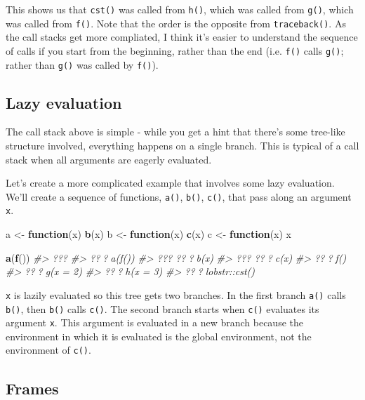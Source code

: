 \documentclass[]{book}
\newenvironment{Shaded}{\begin{snugshade}}{\end{snugshade}}
\newcommand{\CommentTok}[1]{\textcolor[rgb]{0.56,0.35,0.01}{\textit{#1}}}
\newcommand{\ControlFlowTok}[1]{\textcolor[rgb]{0.13,0.29,0.53}{\textbf{#1}}}
\newcommand{\KeywordTok}[1]{\textcolor[rgb]{0.13,0.29,0.53}{\textbf{#1}}}
\newcommand{\NormalTok}[1]{#1}
\newcommand{\StringTok}[1]{\textcolor[rgb]{0.31,0.60,0.02}{#1}}
\theoremstyle{definition}
\theoremstyle{definition}
\theoremstyle{definition}
\theoremstyle{remark}
\begin{document}
This shows us that \texttt{cst()} was called from \texttt{h()}, which
was called from \texttt{g()}, which was called from \texttt{f()}. Note
that the order is the opposite from \texttt{traceback()}. As the call
stacks get more compliated, I think it's easier to understand the
sequence of calls if you start from the beginning, rather than the end
(i.e. \texttt{f()} calls \texttt{g()}; rather than \texttt{g()} was
called by \texttt{f()}).

\hypertarget{lazy-evaluation-1}{%
\subsection{Lazy evaluation}\label{lazy-evaluation-1}}

The call stack above is simple - while you get a hint that there's some
tree-like structure involved, everything happens on a single branch.
This is typical of a call stack when all arguments are eagerly
evaluated.

Let's create a more complicated example that involves some lazy
evaluation. We'll create a sequence of functions, \texttt{a()},
\texttt{b()}, \texttt{c()}, that pass along an argument \texttt{x}.

\begin{Shaded}
\begin{Highlighting}[]
\NormalTok{a <-}\StringTok{ }\ControlFlowTok{function}\NormalTok{(x) }\KeywordTok{b}\NormalTok{(x)}
\NormalTok{b <-}\StringTok{ }\ControlFlowTok{function}\NormalTok{(x) }\KeywordTok{c}\NormalTok{(x)}
\NormalTok{c <-}\StringTok{ }\ControlFlowTok{function}\NormalTok{(x) x}

\KeywordTok{a}\NormalTok{(}\KeywordTok{f}\NormalTok{())}
\CommentTok{#> ???}
\CommentTok{#> ???a(f())}
\CommentTok{#> ??? ???b(x)}
\CommentTok{#> ???   ???c(x)}
\CommentTok{#> ???f()}
\CommentTok{#>   ???g(x = 2)}
\CommentTok{#>     ???h(x = 3)}
\CommentTok{#>       ???lobstr::cst()}
\end{Highlighting}
\end{Shaded}

\texttt{x} is lazily evaluated so this tree gets two branches. In the
first branch \texttt{a()} calls \texttt{b()}, then \texttt{b()} calls
\texttt{c()}. The second branch starts when \texttt{c()} evaluates its
argument \texttt{x}. This argument is evaluated in a new branch because
the environment in which it is evaluated is the global environment, not
the environment of \texttt{c()}.

\hypertarget{frames}{%
\subsection{Frames}\label{frames}}
\end{document}
